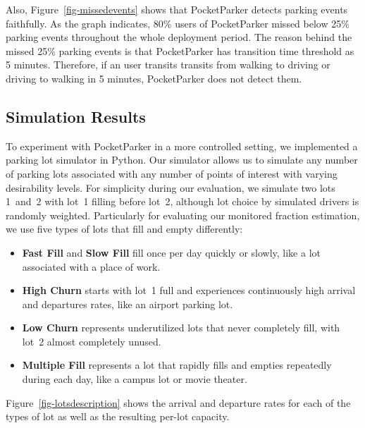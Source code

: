 Also, Figure~\ref{fig-missedevents} shows that PocketParker detects parking
events faithfully. As the graph indicates, 80\% users of PocketParker missed 
below 25\% parking events throughout the whole deployment period. The reason
behind the missed 25\% parking events is that PocketParker has transition 
time threshold as 5 minutes. Therefore, if an user transits transits from 
walking to driving or driving to walking in 5 minutes, PocketParker does 
not detect them.

\subsection{Simulation Results}
\label{subsec-simulator}

To experiment with PocketParker in a more controlled setting, we implemented
a parking lot simulator in Python. Our simulator allows us to simulate any
number of parking lots associated with any number of points of interest with
varying desirability levels. For simplicity during our evaluation, we
simulate two lots 1~and~2 with lot~1 filling before lot~2, although lot
choice by simulated drivers is randomly weighted. Particularly for evaluating
our monitored fraction estimation, we use five types of lots that fill and
empty differently:

\begin{itemize}

\item \textbf{Fast Fill} and \textbf{Slow Fill} fill once per day quickly or
slowly, like a lot associated with a place of work.

\item \textbf{High Churn} starts with lot~1 full and experiences continuously
high arrival and departures rates, like an airport parking lot.

\item \textbf{Low Churn} represents underutilized lots that never completely
fill, with lot~2 almost completely unused.

\item \textbf{Multiple Fill} represents a lot that rapidly fills and empties
repeatedly during each day, like a campus lot or movie theater.

\end{itemize}

Figure~\ref{fig-lotsdescription} shows the arrival and departure rates for
each of the types of lot as well as the resulting per-lot capacity.

